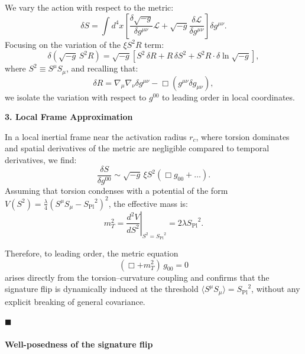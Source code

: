 \documentclass{article}
\newcommand{\Splanck}{\ensuremath{S_{\mathrm{Pl}}}}
\begin{document}
We vary the action with respect to the metric:
\begin{equation}
\delta S = \int d^4x \left[ \frac{\delta \sqrt{-g}}{\delta g^{\mu\nu}} \mathcal{L} + \sqrt{-g} \frac{\delta \mathcal{L}}{\delta g^{\mu\nu}} \right] \delta g^{\mu\nu}.
\end{equation}
Focusing on the variation of the $\xi S^2 R$ term:
\begin{equation}\label{eq:auto189}
\delta (\sqrt{-g} \, S^2 R) = \sqrt{-g} \left[ S^2 \, \delta R + R \, \delta S^2 + S^2 R \cdot \delta \ln \sqrt{-g} \right],
\end{equation}
where $S^2 \equiv S^\mu S_\mu$, and recalling that:
\begin{equation}\label{eq:auto190}
\delta R = \nabla_\mu \nabla_\nu \delta g^{\mu\nu} - \Box (g^{\mu\nu} \delta g_{\mu\nu}),
\end{equation}
we isolate the variation with respect to $g^{00}$ to leading order in local coordinates.

\vspace{1em}
\noindent \textbf{3. Local Frame Approximation}

In a local inertial frame near the activation radius $r_c$, where torsion dominates and spatial derivatives of the metric are negligible compared to temporal derivatives, we find:
\begin{equation}\label{eq:auto191}
\frac{\delta S}{\delta g^{00}} \sim \sqrt{-g} \, \xi S^2 \left( \Box g_{00} + \ldots \right).
\end{equation}
Assuming that torsion condenses with a potential of the form $V(S^2) = \frac{\lambda}{4}(S^\mu S_\mu - \Splanck^2)^2$, the effective mass is:
\begin{equation}\label{eq:auto192}
m_T^2 = \left. \frac{d^2 V}{d S^2} \right|_{S^2 = \Splanck^2} = 2\lambda \Splanck^2.
\end{equation}

Therefore, to leading order, the metric equation
\begin{equation}\label{eq:auto193}
(\Box + m_T^2)\, g_{00} = 0
\end{equation}
arises directly from the torsion–curvature coupling and confirms that the signature flip is dynamically induced at the threshold $\langle S^\mu S_\mu \rangle = \Splanck^2$, without any explicit breaking of general covariance.

\hfill $\blacksquare$

\paragraph{Well-posedness of the signature flip}
\end{document}

